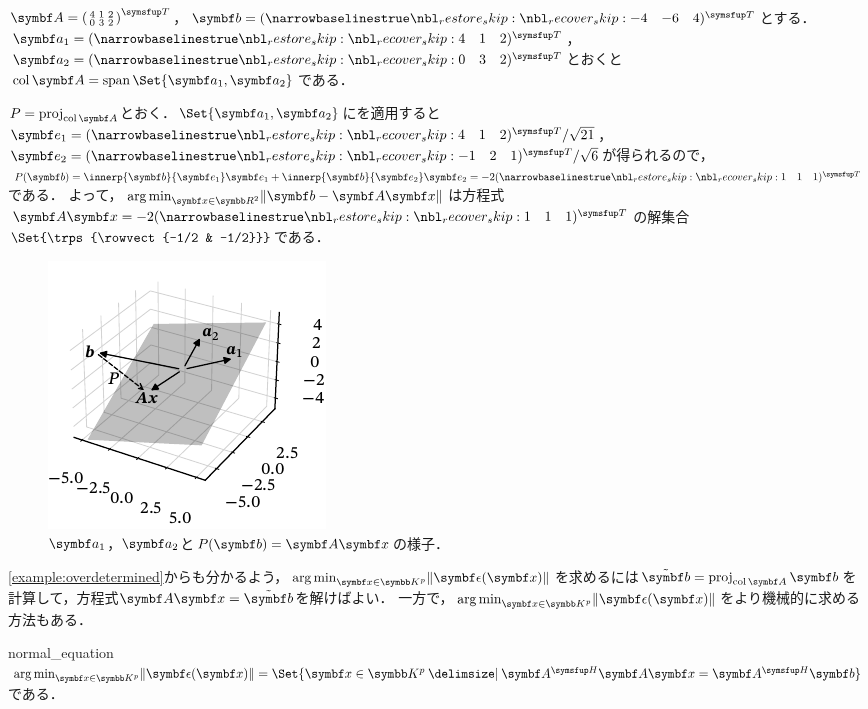 \documentclass[../../main]{subfiles}
\begin{document}
\begin{example}\label{example:overdetermined}
  \(\mat{A}=\trps{\smallmatrice{4 & 1 & 2 \\ 0 & 3 & 2}}\)，\(\vect{b}=\trps{\rowvect{-4 & -6 & 4}}\)とする．
  \(\vect{a}_1=\trps{\rowvect{4 & 1 & 2}}\)，\(\vect{a}_2=\trps{\rowvect{0 & 3 & 2}}\)とおくと\(\colsp\mat{A}=\spannedby\Set{\vect{a}_1,\vect{a}_2}\)である．

  \(P=\proj_{\colsp\mat{A}}\)とおく．\(\Set{\vect{a}_1,\vect{a}_2}\)にを適用すると
  \(\vect{e}_1=\trps{\rowvect{4 & 1 & 2}}/\sqrt{21}\)，\(\vect{e}_2=\trps{\rowvect{-1 & 2 & 1}}/\sqrt{6}\)が得られるので，
  \(P(\vect{b})=\innerp{\vect{b}}{\vect{e}_1}\vect{e}_1+\innerp{\vect{b}}{\vect{e}_2}\vect{e}_2=-2\trps{\rowvect{1 & 1 & 1}}\)である．
  よって，\(\argmin_{\vect{x}\in\numset{R}^2}\vnorm{\vect{b}-\mat{A}\vect{x}}\)は方程式\(\mat{A}\vect{x}=-2\trps{\rowvect{1 & 1 & 1}}\)の解集合\(\Set{\trps{\rowvect{-1/2 & -1/2}}}\)である．
\end{example}

\begin{figure}[htbp]
  \centering
  \includegraphics{figures/overdetermined.pdf}
  \caption{\(\vect{a}_1\)，\(\vect{a}_2\)と\(P(\vect{b})=\mat{A}\vect{x}\)の様子．}
\end{figure}

\cref{example:overdetermined}からも分かるよう，\(\argmin_{\vect{x}\in\numset{K}^p}\vnorm{\vect{\epsilon}(\vect{x})}\)を求めるには\(\tilde{\vect{b}}=\proj_{\colsp\mat{A}}\vect{b}\)を計算して，方程式\(\mat{A}\vect{x}=\tilde{\vect{b}}\)を解けばよい．
一方で，\(\argmin_{\vect{x}\in\numset{K}^p}\vnorm{\vect{\epsilon}(\vect{x})}\)をより機械的に求める方法もある．

\begin{proposition}{}{normal_equation}
  \(\argmin_{\vect{x}\in\numset{K}^p}\vnorm{\vect{\epsilon}(\vect{x})}=\Set{\vect{x}\in\numset{K}^p\given\htrps{\mat{A}}\mat{A}\vect{x}=\htrps{\mat{A}}\vect{b}}\)である．
\end{proposition}
\end{document}
